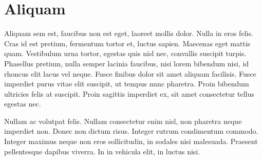 \documentclass{book}
\begin{document}
\chapter{Aliquam}

Aliquam sem est, faucibus non est eget, laoreet mollis dolor. Nulla in eros felis. Cras id est pretium, fermentum tortor et, luctus sapien. Maecenas eget mattis quam. Vestibulum urna tortor, egestas quis nisl nec, convallis suscipit turpis. Phasellus pretium, nulla semper lacinia faucibus, nisi lorem bibendum nisi, id rhoncus elit lacus vel neque. Fusce finibus dolor sit amet aliquam facilisis. Fusce imperdiet purus vitae elit suscipit, ut tempus nunc pharetra. Proin bibendum ultricies felis at suscipit. Proin sagittis imperdiet ex, sit amet consectetur tellus egestas nec.

Nullam ac volutpat felis. Nullam consectetur enim nisl, non pharetra neque imperdiet non. Donec non dictum risus. Integer rutrum condimentum commodo. Integer maximus neque non eros sollicitudin, in sodales nisi malesuada. Praesent pellentesque dapibus viverra. In in vehicula elit, in luctus nisi.
\end{document}
